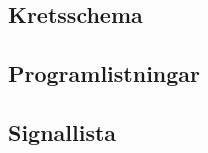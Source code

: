 \documentclass[a4paper,11pt]{article}
\begin{document}
	\subsection{Kretsschema}

	\subsection{Programlistningar}

	\subsection{Signallista}
\end{document}
